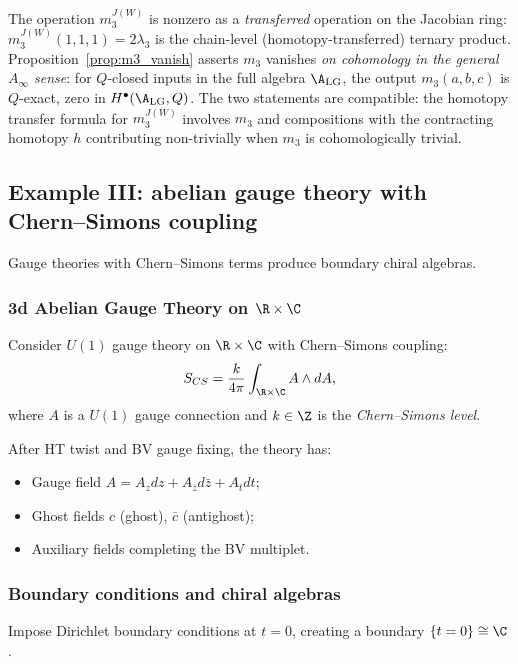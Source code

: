 \begin{remark}
The operation $m_3^{J(W)}$ is nonzero as a \emph{transferred} operation on the Jacobian ring: $m_3^{J(W)}(1,1,1) = 2\lambda_3$ is the chain-level (homotopy-transferred) ternary product. Proposition~\ref{prop:m3_vanish} asserts $m_3$ vanishes \emph{on cohomology in the general $A_\infty$ sense}: for $Q$-closed inputs in the full algebra $\A_{\mathrm{LG}}$, the output $m_3(a,b,c)$ is $Q$-exact, zero in $H^\bullet(\A_{\mathrm{LG}}, Q)$. The two statements are compatible: the homotopy transfer formula for $m_3^{J(W)}$ involves $m_3$ and compositions with the contracting homotopy $h$ contributing non-trivially when $m_3$ is cohomologically trivial.
\end{remark}

\subsection{Example III: abelian gauge theory with Chern--Simons coupling}
\label{rem:abelian_CS}

Gauge theories with Chern--Simons terms produce boundary chiral algebras.

\subsubsection{3d Abelian Gauge Theory on $\R \times \C$}

Consider $U(1)$ gauge theory on $\R \times \C$ with Chern--Simons coupling:
\[
S_{CS} = \frac{k}{4\pi} \int_{\R \times \C} A \wedge dA,
\]
where $A$ is a $U(1)$ gauge connection and $k \in \Z$ is the \emph{Chern--Simons level}.

After HT twist and BV gauge fixing, the theory has:
\begin{itemize}
\item Gauge field $A = A_z dz + A_{\bar{z}} d\bar{z} + A_t dt$;
\item Ghost fields $c$ (ghost), $\bar{c}$ (antighost);
\item Auxiliary fields completing the BV multiplet.
\end{itemize}

\subsubsection{Boundary conditions and chiral algebras}

Impose Dirichlet boundary conditions at $t = 0$, creating a boundary $\{t=0\} \cong \C$.

